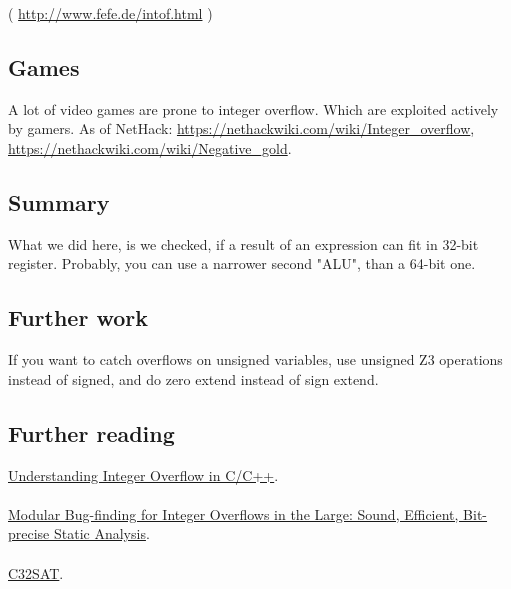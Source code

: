 ( \url{http://www.fefe.de/intof.html} )

\subsection{Games}

A lot of video games are prone to integer overflow.
Which are exploited actively by gamers.
As of NetHack:
\url{https://nethackwiki.com/wiki/Integer_overflow},
\url{https://nethackwiki.com/wiki/Negative_gold}.

\subsection{Summary}

What we did here, is we checked, if a result of an expression can fit in 32-bit register.
Probably, you can use a narrower second "ALU", than a 64-bit one.

\subsection{Further work}

If you want to catch overflows on unsigned variables, use unsigned Z3 operations instead of signed, and do zero extend instead of sign extend.

\subsection{Further reading}

\href{https://www.cs.utah.edu/~regehr/papers/tosem15.pdf}{Understanding Integer Overflow in C/C++}.\\
\\
\href{https://www.microsoft.com/en-us/research/wp-content/uploads/2016/02/z3prefix.pdf}{Modular Bug-finding for Integer Overflows in the Large: Sound, Efficient, Bit-precise Static Analysis}.\\
\\
\href{http://fmv.jku.at/c32sat/}{C32SAT}.

